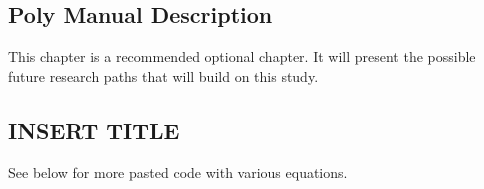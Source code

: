 \documentclass[thesis]{fputhesis}
\begin{document}
\begin{body}
\section{Poly Manual Description}
This chapter is a recommended optional chapter. It will present the possible future research paths that will build on this study.





\renewcommand{\bibsection}{\topskip=1in\chapter*{REFERENCES}\topskip=0in \addcontentsline{toc}{chapter}{REFERENCES}}

\singlespacing






\doublespacing
\begin{appendices}
\renewcommand{\appendixname}{APPENDIX}

\chapter{INSERT TITLE}
See below for more pasted code with various equations.


\end{appendices}
\end{body}
\end{document}
